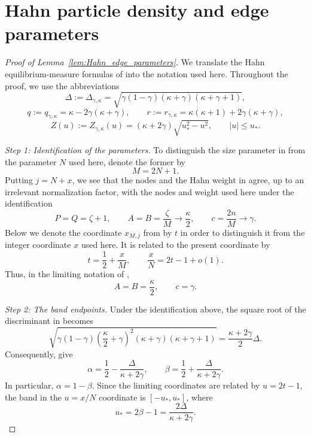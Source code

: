 \documentclass[reqno,11pt]{amsart}
\theoremstyle{plain}
\theoremstyle{definition}
\numberwithin{equation}{section}
\begin{document}
\appendix
\section{Hahn particle density and edge parameters}
\label{app:Hahn_edge_parameters}

\begin{proof}[Proof of Lemma~\ref{lem:Hahn_edge_parameters}]
We translate the Hahn equilibrium-measure formulas of
\cite[\S2.4.2]{baik2007discrete} into the notation used here.
Throughout the proof, we use the abbreviations
\[
\Delta :=
\Delta_{\gamma,\kappa} =
\sqrt{
\gamma(1-\gamma)
(\kappa+\gamma)
(\kappa+\gamma+1)
},
\]
\[
q := q_{\gamma,\kappa} =
\kappa-2\gamma(\kappa+\gamma),
\qquad
r :=
r_{\gamma,\kappa} =
\kappa(\kappa+1)+2\gamma(\kappa+\gamma),
\]
\[
Z(u)
:=
Z_{\gamma,\kappa}(u)
=
(\kappa+2\gamma)\sqrt{u_{\ast}^2-u^2}, \qquad |u|\leq u_{\ast}.
\]

\medskip
\noindent
\emph{Step 1: Identification of the parameters.}
To distinguish the size parameter in \cite{baik2007discrete} from
the parameter $N$ used here, denote the former by
\[
M=2N+1.
\]
Putting $j=N+x$, we see that the nodes and the Hahn weight in
\cite[formulas~(2.69) and~(2.71)]{baik2007discrete} agree, up to an
irrelevant normalization factor, with the nodes and weight used here
under the identification
\[
P=Q=\zeta+1,
\qquad
A=B=\frac{\zeta}{M}\longrightarrow\frac{\kappa}{2},
\qquad
c=\frac{2n}{M}\longrightarrow\gamma.
\]
Below we denote the coordinate $x_{M,j}$ from
\cite[formula~(2.69)]{baik2007discrete} by $t$ in order to distinguish
it from the integer coordinate $x$ used here. It is related to the
present coordinate by
\[
t=\frac12+\frac{x}{M},
\qquad
\frac{x}{N}=2t-1+o(1).
\]
Thus, in the limiting notation of \cite{baik2007discrete},
\[
A=B=\frac{\kappa}{2},
\qquad
c=\gamma.
\]

\medskip
\noindent
\emph{Step 2: The band endpoints.}
Under the identification above, the square root of the discriminant
in \cite[formula~(2.76)]{baik2007discrete} becomes
\[
\sqrt{
\gamma(1-\gamma)
\left(\frac{\kappa}{2}+\gamma\right)^2
(\kappa+\gamma)(\kappa+\gamma+1)
}
=
\frac{\kappa+2\gamma}{2}\Delta.
\]
Consequently, \cite[formulas~(2.75) and~(2.76)]{baik2007discrete}
give
\[
\alpha
=
\frac12-\frac{\Delta}{\kappa+2\gamma},
\qquad
\beta
=
\frac12+\frac{\Delta}{\kappa+2\gamma}.
\]
In particular, $\alpha=1-\beta$. Since the limiting coordinates are
related by $u=2t-1$, the band in the $u=x/N$ coordinate is
$[-u_{\ast},u_{\ast}]$, where
\[
u_{\ast}
=
2\beta-1
=
\frac{2\Delta}{\kappa+2\gamma}.
\]


\end{proof}
\end{document}
